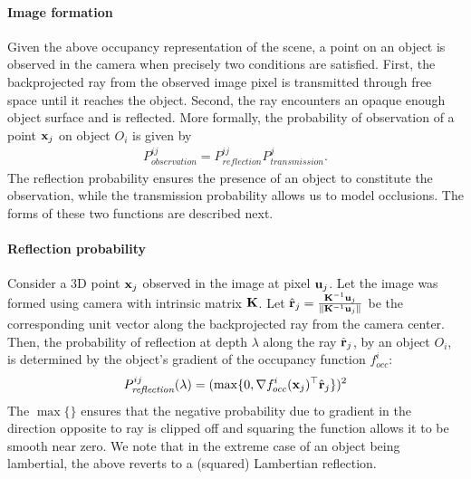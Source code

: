 \paragraph{Image formation}
Given the above occupancy representation of the scene, a point on an object is observed in the camera when precisely two conditions are satisfied. First, the backprojected ray from the observed image pixel is transmitted through free space until it reaches the object. Second, the ray encounters an opaque enough object surface and is reflected. More formally, the probability of observation of a point $\mathbf{x}_j$ on object $O_i$ is given by
\begin{align}
P^{ij}_{\textit{observation}} = P^{ij}_{\textit{reflection}}P^{j}_{\textit{transmission}}.
\label{eq:imgform}
\end{align}
The reflection probability ensures the presence of an object to constitute the observation, while the transmission probability allows us to model occlusions. The forms of these two functions are described next.


\paragraph{Reflection probability}
Consider a 3D point $\mathbf{x}_j$ observed in the image at pixel $\mathbf{u}_j$. Let the image was formed using camera with intrinsic matrix $\mathbf{K}$. Let $\hat{\mathbf{r}}_j = \frac{\mathbf{K}^{-1}\mathbf{u}_j}{\lVert \mathbf{K}^{-1}\mathbf{u}_j \rVert}$ be the corresponding unit vector along the backprojected ray from the camera center. Then, the probability of reflection at depth $\lambda$ along the ray $\hat{\mathbf{r}}_j$, by an object $O_i$, is determined by the object's gradient of the occupancy function $f_{occ}^i$:
\begin{align}
  P^{ij}_{\textit{reflection}} (\lambda) = (\max \{0, \nabla {f^i_{occ}}(\mathbf{x}_j)^\top \hat{\mathbf{r}}_j \})^2
\end{align}
The $\max \{ \}$ ensures that the negative probability due to gradient in the direction opposite to ray is clipped off and squaring the function allows it to be smooth near zero. We note that in the extreme case of an object being lambertial, the above reverts to a (squared) Lambertian reflection.


